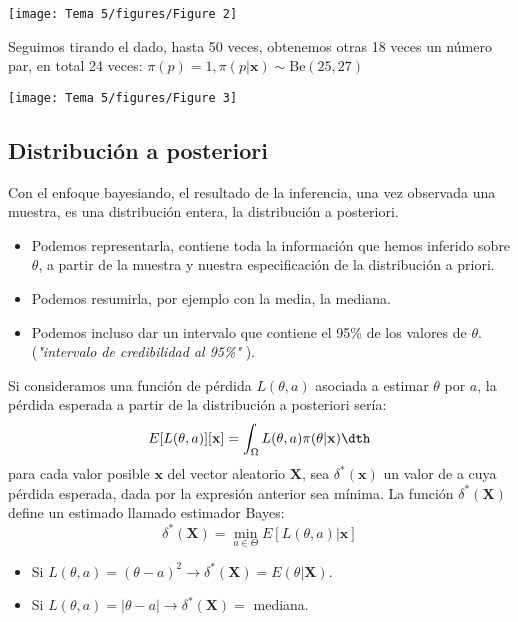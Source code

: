 \begin{center}
    \texttt{[image: Tema 5/figures/Figure 2]}
\end{center}
Seguimos tirando el dado, hasta 50 veces, obtenemos otras 18 veces un número par, en total 24 veces: $\pi(p)=1,\pi(p|\mathbf{x})\sim \mathrm{Be}(25,27)$ 
\begin{center}
    \texttt{[image: Tema 5/figures/Figure 3]}
\end{center}
\subsection{Distribución a posteriori}
Con el enfoque bayesiando, el resultado de la inferencia, una vez observada una muestra, es una distribución entera, la distribución a posteriori.
\begin{itemize}[label=\textbullet]
    \item Podemos representarla, contiene toda la información que hemos inferido sobre $\theta$, a partir de la muestra y nuestra especificación de la distribución a priori.
    \item Podemos resumirla, por ejemplo con la media, la mediana.
    \item Podemos incluso dar un intervalo que contiene el 95\% de los valores de $\theta$. (\textit{"intervalo de credibilidad al 95\%"} ).
\end{itemize}
\begin{tcolorbox}[colback=blue!5!white, colframe=blue!75!black, title=\textbf{Estimador Bayes}]
Si consideramos una función de pérdida $L(\theta,a)$ asociada a estimar  $\theta$ por  $a$, la pérdida esperada a partir de la distribución a posteriori sería:  \[
    E[L(\theta,a)][\mathbf{x}]=\int_\Omega L(\theta,a)\pi(\theta|\mathbf{x})\dth 
\] para cada valor posible $\mathbf{x}$ del vector aleatorio $\mathbf{X}$, sea $\delta^*(\mathbf{x})$ un valor de a cuya pérdida esperada, dada por la expresión anterior sea mínima. La función $\delta^*(\mathbf{X})$ define un estimado llamado estimador Bayes: \[
\delta^*(\mathbf{X})=\min_{a\in \Theta}E[L(\theta,a)|\mathbf{x}]
\] 
\begin{itemize}[label=\textbullet]
    \item Si $L(\theta,a)=(\theta-a)^2\longrightarrow \delta^*(\mathbf{X})=E(\theta|\mathbf{X})$.
    \item Si $L(\theta,a)=|\theta-a|\longrightarrow \delta^*(\mathbf{X})=$ mediana.
\end{itemize}
\end{tcolorbox}
